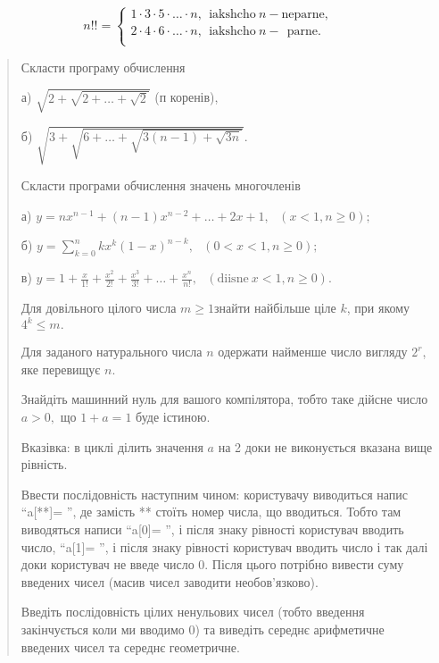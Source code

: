 \documentclass[]{article}
\begin{document}
\[n!! = \left\{ \begin{matrix}
1 \cdot 3 \cdot 5 \cdot \ldots \cdot n,\mathrm{\ \ iakshcho\ }n - \mathrm{neparne,} \\
2 \cdot 4 \cdot 6 \cdot \ldots \cdot n,\mathrm{\ \ iakshcho\ }n - \mathrm{\ \ parne.} \\
\end{matrix} \right.\ \]

\begin{quote}
Скласти програму обчислення

а) \(\sqrt{2 + \sqrt{2 + \ldots + \sqrt{2}}}\) (п коренів),

б) \(\sqrt{3 + \sqrt{6 + \ldots + \sqrt{3(n - 1) + \sqrt{3n}}}}.\)

Скласти програми обчислення значень многочленів

а)
\(y = nx^{n - 1} + (n - 1)x^{n - 2} + \ldots + 2x + 1,\mathrm{\text{\ \ \ }}(x < 1,n \geq 0);\)

б)
\(y = \sum_{k = 0}^{n}{kx^{k}(1 - x)^{n - k}},\mathrm{\text{\ \ \ \ \ \ \ \ \ \ \ \ \ \ \ \ \ \ \ \ \ \ \ \ \ \ }}(0 < x < 1,n \geq 0);\)

в)
\(y = 1 + \frac{x}{1!} + \frac{x^{2}}{2!} + \frac{x^{3}}{3!} + \ldots + \frac{x^{n}}{n!},\mathrm{\text{\ \ \ \ \ \ \ \ \ \ \ }}(\mathrm{diisne\ }x < 1,n \geq 0).\)

Для довільного цілого числа \(m \geq 1\)знайти найбільше ціле \(k\), при
якому \(4^{k} \leq m.\)

Для заданого натурального числа \(n\) одержати найменше число вигляду
\(2^{r}\), яке перевищує \(n\).

Знайдіть машинний нуль для вашого компілятора, тобто таке дійсне число
\(a > 0,\) що \(1 + a = 1\) буде істиною.

Вказівка: в циклі ділить значення \(a\) на 2 доки не виконується вказана
вище рівність.

Ввести послідовність наступним чином: користувачу виводиться напис
``a{[}**{]}= '', де замість ** стоїть номер числа, що вводиться. Тобто
там виводяться написи ``a{[}0{]}= '', і після знаку рівності користувач
вводить число, ``a{[}1{]}= '', і після знаку рівності користувач вводить
число і так далі доки користувач не введе число 0. Після цього потрібно
вивести суму введених чисел (масив чисел заводити необов'язково).

Введіть послідовність цілих ненульових чисел (тобто введення
закінчується коли ми вводимо 0) та виведіть середнє арифметичне введених
чисел та середнє геометричне.


\end{quote}
\end{document}
